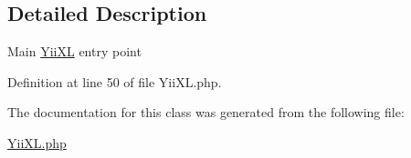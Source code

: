 \subsection{Detailed Description}
Main \hyperlink{classYiiXL}{YiiXL} entry point 

Definition at line 50 of file YiiXL.php.



The documentation for this class was generated from the following file:\begin{DoxyCompactItemize}
\item 
\hyperlink{YiiXL_8php}{YiiXL.php}\end{DoxyCompactItemize}
